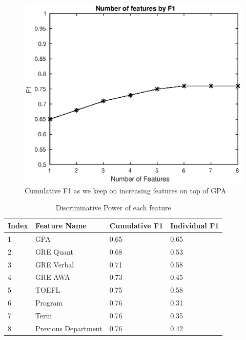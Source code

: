 \documentclass{sig-alternate-05-2015}
\begin{document}
\begin{figure}[t]
\centering
\includegraphics[scale=0.6]{ablation.eps}
\caption{Cumulative F1 as we keep on increasing features on top of GPA}
\label{fig:ablation}
\end{figure}

\begin{table}[t]
\centering
\caption{Discriminative Power of each feature}
\label{tab:ablation}
\begin{tabular}{p{0.5 cm} p{2.5 cm} p{1.3 cm} p{1.3 cm}}\\
Index & Feature Name & Cumulative F1 & Individual F1 \\ \hline
1 & GPA & 0.65 & 0.65 \\ \hline
2 & GRE Quant & 0.68 & 0.53 \\ \hline
3 & GRE Verbal & 0.71 & 0.58 \\ \hline
4 & GRE AWA & 0.73 & 0.45 \\ \hline
5 & TOEFL & 0.75 & 0.58 \\ \hline
6 & Program & 0.76 & 0.31 \\ \hline
7 & Term & 0.76 & 0.35 \\ \hline
8 & Previous Department & 0.76 & 0.42 \\ \hline
\end{tabular}
\end{table}
\end{document}
